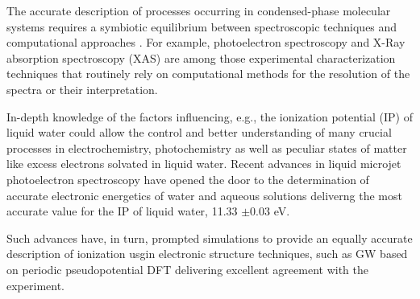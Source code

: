 \documentclass[notitlepage,12pt]{report}
\begin{document}
    The accurate description of processes occurring in condensed-phase molecular systems requires a symbiotic  equilibrium between spectroscopic techniques\supercite{reimann2021two,malerz2021low,bolognesi2021combined} and computational approaches \supercite{couto2007understanding,ambrosio2016structural,ozaki2021advances}. For example, photoelectron spectroscopy \supercite{thurmer2021accurate,perry2020ionization,credidio2021quantitative,thurmer2021valence,tolle2019charged,gaiduk2018electron,gaiduk2016photoelectron,seidel2016valence} and X-Ray absorption spectroscopy (XAS)\supercite{zhovtobriukh2019liquid,zhang2020isotope,smith2020femtosecond} are among those experimental characterization techniques that routinely rely on computational methods for the resolution of the spectra or their interpretation.
	
    In-depth knowledge of the factors influencing, e.g., the ionization potential (IP) of liquid water could allow the control and better understanding of many crucial processes in electrochemistry\supercite{marenich2014computational}, photochemistry\supercite{reuther1996primary,hu2021photochemical} as well as peculiar states of matter like excess electrons solvated in liquid water\supercite{ambrosio2017electronic}.  Recent advances in liquid microjet  photoelectron spectroscopy have opened the door to the determination of accurate electronic energetics of water and aqueous solutions \supercite{thurmer2021accurate,perry2020ionization,credidio2021quantitative,thurmer2021valence} deliverng the  most accurate value for the IP of liquid water, 11.33 $\pm$0.03 eV. 

    Such advances have, in turn, prompted simulations to provide an equally accurate description of ionization usgin electronic structure techniques, such as GW based on periodic pseudopotential DFT \supercite{gaiduk2018electron,ziaei2018probing,dal2014pseudopotentials} delivering excellent agreement with the experiment.
	
\end{document}
